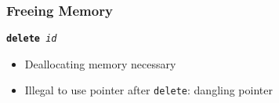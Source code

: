 \begin{frame}
  \frametitle{Freeing Memory}
  \begin{center}
    \tt {\bfseries delete} {\it id}
  \end{center}
  \begin{itemize}
    \item Deallocating memory necessary
    \item Illegal to use pointer after {\tt delete}: dangling pointer
  \end{itemize}
  \vskip5mm
\end{frame}




